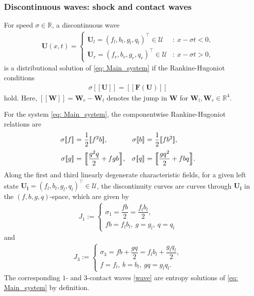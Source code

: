 \documentclass[11pt]{article}
\numberwithin{equation}{section}
\newtheorem{counter example}[theorem]{Counter Example}
\begin{document}
{\subsubsection{Discontinuous waves: shock and contact waves}
For speed $\sigma \in \mathbb{R}$,  a discontinuous wave 
\begin{align} \label{wave}
    \mathbf{U} (x, t)=\begin{cases}
        \mathbf{U}_l=(f_l, b_l, g_l, q_l )^\top\in {\mathcal U}&:~x-\sigma t<0,\\
        \mathbf{U}_r=(f_r, b_r, g_r, q_r)^\top \in {\mathcal U}&:~x-\sigma t> 0,
    \end{cases}
\end{align}
is a distributional solution of \eqref{eq: Main_system} if the  Rankine-Hugoniot conditions 
\begin{align}\label{RH}
\sigma[\![\mathbf{U}]\!]  =[\![\mathbf{F(U)}]\!]
\end{align}
hold. Here,  $[\![\mathbf{W}]\!]=\mathbf{W}_r-\mathbf{W}_l$ denotes the jump in $\mathbf{W}$ for $\mathbf{W}_l, \mathbf{W}_r\in \mathbb{R}^4$.

For the system \eqref{eq: Main_system},  the componentwise Rankine-Hugoniot relations  are
\begin{equation}\label{eq: 4.8}
    \begin{array}{rclrcl}
    \sigma[\![f]\!]\!\!\!\!&=&\!\!\!\!\dfrac{1}{2}[\![f^2b]\!],&
    \sigma[\![b]\!]\!\!\!\!&=&\!\!\!\!\dfrac{1}{2}[\![fb^2]\!],\vspace{0.2 cm}\\
    \sigma[\![g]\!]\!\!\!\!&=&\!\!\!\!\Big[\!\!\Big[\dfrac{g^2q}{2}+fgb\Big]\!\!\Big],&
    \sigma[\![q]\!]\!\!\!\!&=& \!\!\!\!\Big[\!\!\Big[\dfrac{gq^2}{2}+fbq\Big]\!\!\Big].
    \end{array}
\end{equation}
Along the first and third linearly degenerate characteristic fields, for a given left state $\mathbf{U_l}=(f_l, b_l, g_l, q_l)^{\top}\in \mathcal{U}$, the discontinuity curves are  curves through $\mathbf{U_l}$ in the $(f, b, g, q)$-space, which are given by
\begin{align}\label{eq: 23a}
    J_1:=\begin{cases}
    \sigma_1=\dfrac{fb}{2}=\dfrac{f_lb_l}{2},\\ 
    fb=f_lb_l,~g=g_l, ~q=q_l
    \end{cases}
\end{align}
and 
\begin{align}\label{eq: 23b}
    J_3:=\begin{cases}
    \sigma_3=fb+\dfrac{gq}{2}=f_lb_l+\dfrac{g_lq_l}{2},\\ 
    f=f_l, ~b=b_l,  ~gq=g_lq_l.
    \end{cases}
\end{align}
The corresponding $1$- and $3$-contact waves \eqref{wave} are entropy solutions of \eqref{eq: Main_system} by definition.

}
\end{document}
